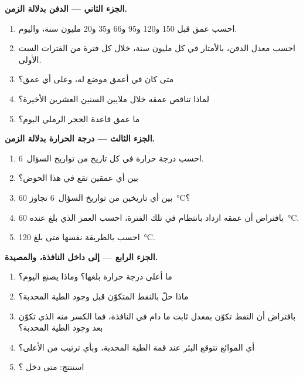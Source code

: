 \begin{problem}
\medskip
\noindent\textbf{الجزء الثاني --- الدفن بدلالة الزمن.}
\begin{enumerate}[resume]
  \item احسب عمق  قبل 150 و120 و95 و66 و35 و20
        مليون سنة، واليوم.
  \item احسب معدل الدفن، بالأمتار في كل مليون سنة، خلال
        كل فترة من الفترات الست الأولى.
  \item متى كان  في أعمق موضع له، وعلى أي عمق؟
  \item لماذا تناقص عمقه خلال ملايين السنين العشرين الأخيرة؟
  \item ما عمق قاعدة الحجر الرملي اليوم؟
\end{enumerate}

\medskip
\noindent\textbf{الجزء الثالث --- درجة الحرارة بدلالة الزمن.}
\begin{enumerate}[resume]
  \item احسب درجة حرارة  في كل تاريخ من تواريخ
        السؤال~6.
  \item بين أي عمقين تقع  في هذا الحوض؟
  \item بين أي تاريخين من تواريخ السؤال~6 تجاوز 
        \qty{60}{\degreeCelsius}؟
  \item بافتراض أن عمقه ازداد بانتظام في تلك الفترة، احسب العمر
        الذي بلغ عنده \qty{60}{\degreeCelsius}.
  \item احسب بالطريقة نفسها متى بلغ \qty{120}{\degreeCelsius}.
\end{enumerate}

\medskip
\noindent\textbf{الجزء الرابع --- إلى داخل النافذة، والمصيدة.}
\begin{enumerate}[resume]
  \item ما أعلى درجة حرارة بلغها؟ وماذا يصنع
        اليوم؟
  \item ماذا حلّ بالنفط المتكوّن قبل وجود الطية المحدبة؟
  \item بافتراض أن النفط تكوّن بمعدل ثابت ما دام  في
        النافذة، فما الكسر منه الذي تكوّن بعد وجود الطية المحدبة؟
  \item أي الموائع تتوقع البئر عند قمة الطية المحدبة،
        وبأي ترتيب من الأعلى؟
  \item استنتج: متى دخل  ؟
\end{enumerate}
\end{problem}
